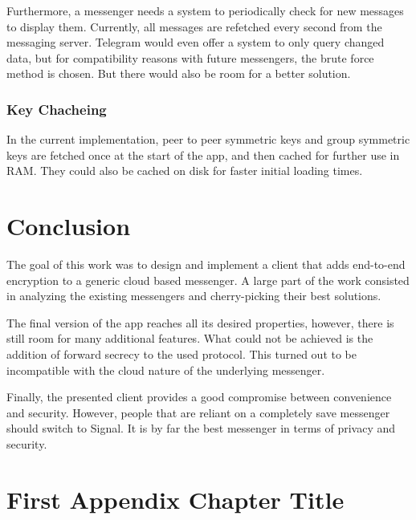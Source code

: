 \documentclass[a4paper, oneside]{discothesis}
\begin{document}
Furthermore, a messenger needs a system to periodically check for new messages to display them. Currently, all messages are refetched every second from the messaging server. Telegram would even offer a system to only query changed data, but for compatibility reasons with future messengers, the brute force method is chosen. But there would also be room for a better solution.

\subsection{Key Chacheing}

In the current implementation, peer to peer symmetric keys and group symmetric keys are fetched once at the start of the app, and then cached for further use in RAM. They could also be cached on disk for faster initial loading times.

\chapter{Conclusion}

The goal of this work was to design and implement a client that adds end-to-end encryption to a generic cloud based messenger. A large part of the work consisted in analyzing the existing messengers and cherry-picking their best solutions.

The final version of the app reaches all its desired properties, however, there is still room for many additional features. What could not be achieved is the addition of forward secrecy to the used protocol. This turned out to be incompatible with the cloud nature of the underlying messenger.

Finally, the presented client provides a good compromise between convenience and security. However, people that are reliant on a completely save messenger should switch to Signal. It is by far the best messenger in terms of privacy and security.




\appendix
\chapter{First Appendix Chapter Title}
\end{document}
